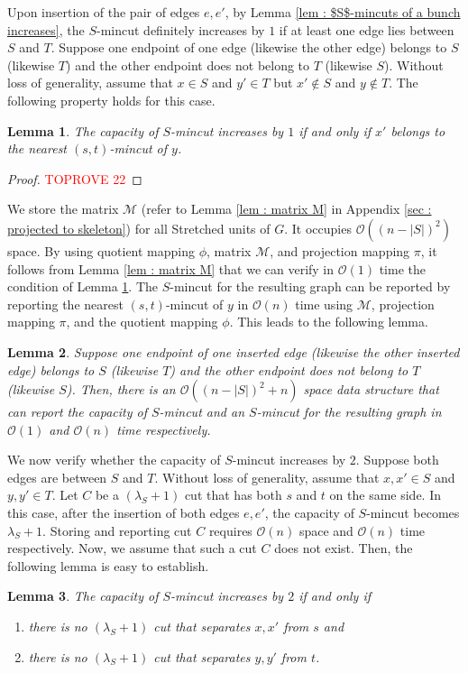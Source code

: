 \documentclass[letterpaper,11pt]{article}
\newtheorem{lemma}{Lemma}[]
\begin{document}
Upon insertion of the pair of edges $e,e'$, by Lemma \ref{lem : $S$-mincuts of a bunch increases}, the $S$-mincut definitely increases by $1$ if at least one edge lies between $S$ and $T$. Suppose one endpoint of one edge (likewise the other edge) belongs to $S$ (likewise $T$) and the other endpoint does not belong to $T$ (likewise $S$). Without loss of generality, assume that  $x\in S$ and $y'\in T$ but $x'\notin S$ and $y\notin T$. The following property holds for this case. \begin{lemma} \label{lem : belong to nearest cut}
    The capacity of $S$-mincut increases by $1$ if and only if $x'$ belongs to the nearest $(s,t)$-mincut of $y$.
\end{lemma}
\begin{proof}\textcolor{red}{TOPROVE 22}\end{proof}
We store the matrix ${\mathcal M}$ (refer to Lemma \ref{lem : matrix M} in Appendix \ref{sec : projected to skeleton}) for all Stretched units of $G$. It occupies ${\mathcal O}((n-|S|)^2)$ space. By using quotient mapping $\phi$, matrix ${\mathcal M}$, and projection mapping $\pi$, it follows from Lemma \ref{lem : matrix M} that we can verify in ${\mathcal O}(1)$ time the condition of Lemma \ref{lem : belong to nearest cut}. The $S$-mincut for the resulting graph can be reported by reporting the nearest $(s,t)$-mincut of $y$ in ${\mathcal O}(n)$ time using ${\mathcal M}$, projection mapping $\pi$, and the quotient mapping $\phi$. This leads to the following lemma.
\begin{lemma} \label{lem : increase by 1 when in nearest cut of a vertex}
    Suppose one endpoint of one inserted edge (likewise the other inserted edge) belongs to $S$ (likewise $T$) and the other endpoint does not belong to $T$ (likewise $S$). Then, there is an ${\mathcal O}((n-|S|)^2+n)$ space data structure that can report the capacity of $S$-mincut and an $S$-mincut for the resulting graph in ${\mathcal O}(1)$ and ${\mathcal O}(n)$ time respectively.
\end{lemma}
We now verify whether the capacity of $S$-mincut increases by $2$. Suppose both edges are between $S$ and $T$. Without loss of generality, assume that $x,x'\in S$ and $y,y'\in T$. Let $C$ be a $(\lambda_S+1)$ cut that has both $s$ and $t$ on the same side. In this case, after the insertion of both edges $e,e'$, the capacity of $S$-mincut becomes $\lambda_S+1$. Storing and reporting cut $C$ requires ${\mathcal O}(n)$ space and ${\mathcal O}(n)$ time respectively. Now, we assume that such a cut $C$ does not exist. Then, the following lemma is easy to establish. \begin{lemma} \label{lem : increase by 2 condition}
    The capacity of $S$-mincut increases by $2$ if and only if 
    \begin{enumerate}
        \item there is no $(\lambda_S+1)$ cut that separates $x,x'$ from $s$ and 
        \item there is no $(\lambda_S+1)$ cut that separates $y,y'$ from $t$.
    \end{enumerate}
\end{lemma}
\end{document}
